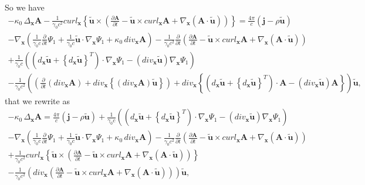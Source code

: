\documentclass{article}
\theoremstyle{definition}
\theoremstyle{remark}
\renewcommand{\vec}[1]{\mathbf{#1}}
\begin{document}
So we have
\begin{multline}\label{MaxVacFullPPNnnnffffffyuughjhjhjhhjhhGG}
-\kappa_0\,\Delta_{\vec x}\vec A-\frac{1}{\gamma_0 c^2}curl_{\vec x}
\left\{\vec {\tilde u}\times
\left(\frac{\partial\vec A}{\partial t}-\vec {\tilde u}\times
curl_{\vec x}\vec A+\nabla_{\vec x}\left(\vec A\cdot\vec {\tilde
u}\right)\right)\right\}=\frac{4\pi}{c}\left(\vec j-\rho\vec {\tilde
u}\right)\\-\nabla_{\vec x}\left(\frac{1}{\gamma_0
c}\frac{\partial}{\partial t}\Psi_1+\frac{1}{\gamma_0 c}\vec {\tilde
u}\cdot\nabla_{\vec x}\Psi_1+\kappa_0\,div_{\vec x} \vec
A\right)-\frac{1}{\gamma_0 c^2}\frac{\partial}{\partial
t}\left(\frac{\partial\vec A}{\partial t}-\vec {\tilde u}\times
curl_{\vec x}\vec A+\nabla_{\vec x}\left(\vec A\cdot\vec {\tilde
u}\right)\right)\\+\frac{1}{\gamma_0 c}\left(\left(d_{\vec x}\vec
{\tilde u}+\left\{d_{\vec x}\vec {\tilde u}\right\}^T\right)\cdot
\nabla_{\vec x}\Psi_1-\left(div_{\vec x}\vec {\tilde
u}\right)\nabla_{\vec x}\Psi_1\right)\\-\frac{1}{\gamma_0
c^2}\left(\left(\frac{\partial}{\partial t}\left(div_{\vec x}\vec
A\right)+div_{\vec x} \left\{\left(div_{\vec x}\vec A\right)\vec
{\tilde u}\right\}\right)+div_{\vec x} \left\{\left(d_{\vec x}\vec
{\tilde u}+\left\{d_{\vec x}\vec {\tilde
u}\right\}^T\right)\cdot\vec A-\left(div_{\vec x}\vec {\tilde
u}\right)\vec A\right\}\right)\vec {\tilde u},
\end{multline}
that we rewrite as
\begin{multline}\label{MaxVacFullPPNnnnffffffyuughjhjhjhhjjkjhkkjhhGG}
-\kappa_0\,\Delta_{\vec x}\vec A= \frac{4\pi}{c}\left(\vec
j-\rho\vec {\tilde u}\right)+\frac{1}{\gamma_0 c}\left(\left(d_{\vec
x}\vec {\tilde u}+\left\{d_{\vec x}\vec {\tilde
u}\right\}^T\right)\cdot \nabla_{\vec x}\Psi_1-\left(div_{\vec
x}\vec {\tilde u}\right)\nabla_{\vec x}\Psi_1\right)\\-\nabla_{\vec
x}\left(\frac{1}{\gamma_0 c}\frac{\partial}{\partial
t}\Psi_1+\frac{1}{\gamma_0 c}\vec {\tilde u}\cdot\nabla_{\vec
x}\Psi_1+\kappa_0\,div_{\vec x} \vec A\right)-\frac{1}{\gamma_0
c^2}\frac{\partial}{\partial t}\left(\frac{\partial\vec A}{\partial
t}-\vec {\tilde u}\times curl_{\vec x}\vec A+\nabla_{\vec
x}\left(\vec A\cdot\vec {\tilde u}\right)\right)\\+\frac{1}{\gamma_0
c^2}curl_{\vec x} \left\{\vec {\tilde u}\times
\left(\frac{\partial\vec A}{\partial t}-\vec {\tilde u}\times
curl_{\vec x}\vec A+\nabla_{\vec x}\left(\vec A\cdot\vec {\tilde
u}\right)\right)\right\}\\-\frac{1}{\gamma_0 c^2}\left(div_{\vec
x}\left(\frac{\partial\vec A}{\partial t}-\vec {\tilde u}\times
curl_{\vec x}\vec A+\nabla_{\vec x}\left(\vec A\cdot\vec {\tilde
u}\right)\right)\right)\vec {\tilde u},
\end{multline}
\end{document}

